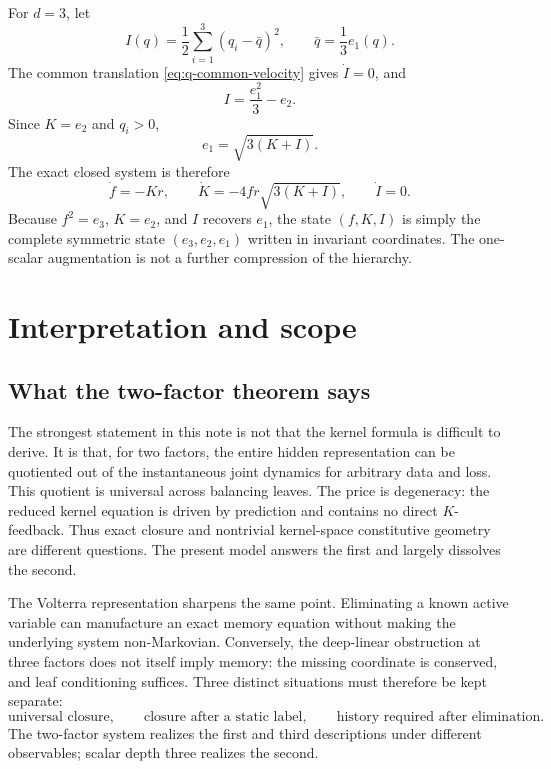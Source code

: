 \documentclass[11pt]{article}
\begin{document}
For $d=3$, let
\begin{equation}
  I(q)=\frac12\sum_{i=1}^3(q_i-\bar q)^2,
  \qquad
  \bar q=\frac13e_1(q).
  \label{eq:I}
\end{equation}
The common translation \eqref{eq:q-common-velocity} gives $\dot I=0$, and
\begin{equation}
  I=\frac{e_1^2}{3}-e_2.
  \label{eq:I-identity}
\end{equation}
Since $K=e_2$ and $q_i>0$,
\begin{equation}
  e_1=\sqrt{3(K+I)}.
\end{equation}
The exact closed system is therefore
\begin{equation}
  \boxed{
  \dot f=-Kr,
  \qquad
  \dot K=-4fr\sqrt{3(K+I)},
  \qquad
  \dot I=0.}
  \label{eq:depth-three-closure}
\end{equation}
Because $f^2=e_3$, $K=e_2$, and $I$ recovers $e_1$, the state $(f,K,I)$ is simply the complete symmetric state $(e_3,e_2,e_1)$ written in invariant coordinates.  The one-scalar augmentation is not a further compression of the hierarchy.

\section{Interpretation and scope}
\label{sec:interpretation}

\subsection{What the two-factor theorem says}

The strongest statement in this note is not that the kernel formula is difficult to derive.  It is that, for two factors, the entire hidden representation can be quotiented out of the instantaneous joint dynamics for arbitrary data and loss.  This quotient is universal across balancing leaves.  The price is degeneracy: the reduced kernel equation is driven by prediction and contains no direct $K$-feedback.  Thus exact closure and nontrivial kernel-space constitutive geometry are different questions.  The present model answers the first and largely dissolves the second.

The Volterra representation sharpens the same point.  Eliminating a known active variable can manufacture an exact memory equation without making the underlying system non-Markovian.  Conversely, the deep-linear obstruction at three factors does not itself imply memory: the missing coordinate is conserved, and leaf conditioning suffices.  Three distinct situations must therefore be kept separate:
\begin{equation}
  \text{universal closure},
  \qquad
  \text{closure after a static label},
  \qquad
  \text{history required after elimination}.
\end{equation}
The two-factor system realizes the first and third descriptions under different observables; scalar depth three realizes the second.
\end{document}
